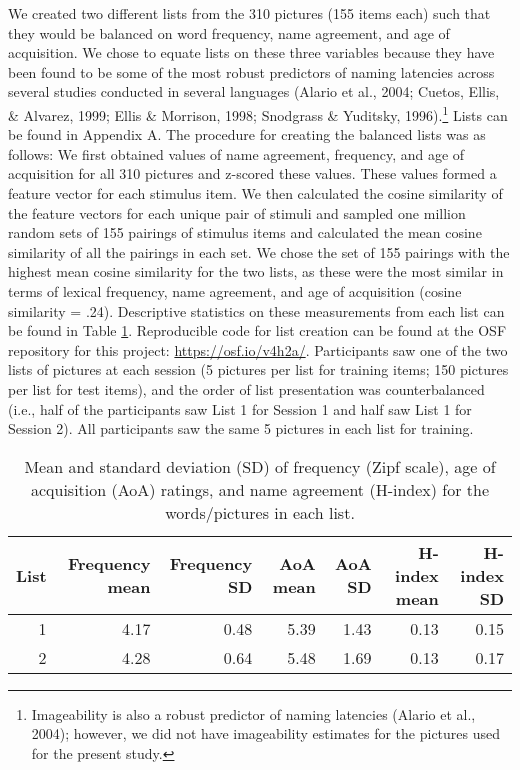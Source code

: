 \documentclass[
  man,floatsintext]{apa6}
\begin{document}
We created two different lists from the 310 pictures (155 items each) such that they would be balanced on word frequency, name agreement, and age of acquisition. We chose to equate lists on these three variables because they have been found to be some of the most robust predictors of naming latencies across several studies conducted in several languages (Alario et al., 2004; Cuetos, Ellis, \& Alvarez, 1999; Ellis \& Morrison, 1998; Snodgrass \& Yuditsky, 1996).\footnote{Imageability is also a robust predictor of naming latencies (Alario et al., 2004); however, we did not have imageability estimates for the pictures used for the present study.} Lists can be found in Appendix A. The procedure for creating the balanced lists was as follows: We first obtained values of name agreement, frequency, and age of acquisition for all 310 pictures and z-scored these values. These values formed a feature vector for each stimulus item. We then calculated the cosine similarity of the feature vectors for each unique pair of stimuli and sampled one million random sets of 155 pairings of stimulus items and calculated the mean cosine similarity of all the pairings in each set. We chose the set of 155 pairings with the highest mean cosine similarity for the two lists, as these were the most similar in terms of lexical frequency, name agreement, and age of acquisition (cosine similarity = .24). Descriptive statistics on these measurements from each list can be found in Table \ref{tab:stimuli}. Reproducible code for list creation can be found at the OSF repository for this project: \url{https://osf.io/v4h2a/}. Participants saw one of the two lists of pictures at each session (5 pictures per list for training items; 150 pictures per list for test items), and the order of list presentation was counterbalanced (i.e., half of the participants saw List 1 for Session 1 and half saw List 1 for Session 2). All participants saw the same 5 pictures in each list for training.

\begin{table}

\caption{\label{tab:stimuli}Mean and standard deviation (SD) of frequency (Zipf scale), age of acquisition (AoA) ratings, and name agreement (H-index) for the words/pictures in each list.}
\centering
\begin{tabular}[t]{rrrrrrr}
\toprule
List & Frequency mean & Frequency SD & AoA mean & AoA SD & H-index mean & H-index SD\\
\midrule
1 & 4.17 & 0.48 & 5.39 & 1.43 & 0.13 & 0.15\\
2 & 4.28 & 0.64 & 5.48 & 1.69 & 0.13 & 0.17\\
\bottomrule
\end{tabular}
\end{table}
\end{document}
